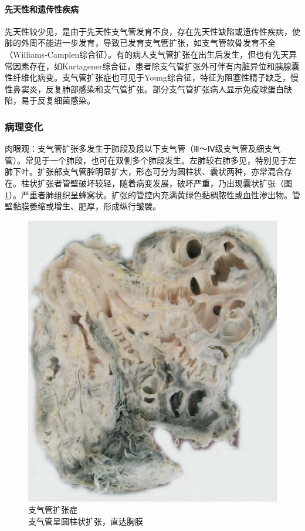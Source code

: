 \paragraph{先天性和遗传性疾病}
先天性较少见，是由于先天性支气管发育不良，存在先天性缺陷或遗传性疾病，使肺的外周不能进一步发育，导致已发育支气管扩张，如支气管软骨发育不全（Williams-Camplen综合征）。有的病人支气管扩张在出生后发生，但也有先天异常因素存在，如Kartagener综合征，患者除支气管扩张外可伴有内脏异位和胰腺囊性纤维化病变。支气管扩张症也可见于Young综合征，特征为阻塞性精子缺乏，慢性鼻窦炎，反复肺部感染和支气管扩张。部分支气管扩张病人显示免疫球蛋白缺陷，易于反复细菌感染。

\subsubsection{病理变化}

肉眼观：支气管扩张多发生于肺段及段以下支气管（Ⅲ～Ⅳ级支气管及细支气管）。常见于一个肺段，也可在双侧多个肺段发生。左肺较右肺多见，特别见于左肺下叶。扩张部支气管腔明显扩大，形态可分为圆柱状、囊状两种，亦常混合存在。柱状扩张者管壁破坏较轻，随着病变发展，破坏严重，乃出现囊状扩张（图\ref{fig7-2}）。严重者肺组织呈蜂窝状。扩张的管腔内充满黄绿色黏稠脓性或血性渗出物。管壁黏膜萎缩或增生、肥厚，形成纵行皱襞。

\begin{figure}[!htbp]
 \centering
 \includegraphics{./images/Image00111.jpg}
 \captionsetup{justification=centering}
 \caption{支气管扩张症\\ {\small 支气管呈圆柱状扩张，直达胸膜}}
\label{fig7-2}
  \end{figure}

